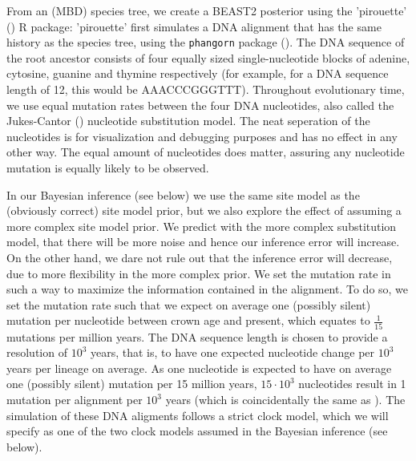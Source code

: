\documentclass{article}
\begin{document}
From an (MBD) species tree, we create a BEAST2 posterior using
the 'pirouette' (\cite{pirouette}) R package: 
'pirouette' first simulates a DNA alignment that has the same history
as the species tree, using the \verb;phangorn; package (\cite{phangorn}).
The DNA sequence of the root ancestor consists of four equally sized single-nucleotide 
blocks of adenine, cytosine, guanine and thymine 
respectively (for example, for a DNA sequence length of 12, this would 
be AAACCCGGGTTT). Throughout evolutionary time, we use equal 
mutation rates between the four DNA nucleotides, 
also called the Jukes-Cantor (\cite{jc69}) nucleotide substitution model.
The neat seperation of the nucleotides is for visualization and debugging
purposes and has no effect in any other way. 
The equal amount of nucleotides does matter, assuring any nucleotide
mutation is equally likely to be observed.

In our Bayesian inference (see below) we use the same site model as the (obviously correct) site model prior,
but we also explore the effect of assuming a more complex site model prior.
We predict with the more complex substitution model, 
that there will be more noise and hence our inference error will increase.
On the other hand, we dare not rule out that the inference error will decrease,
due to more flexibility in the more complex prior.
We set the mutation rate in such a way to maximize the information contained in the alignment.
To do so, we set the mutation rate such that we expect on average one (possibly silent) mutation per nucleotide
between crown age and present, which equates to $\frac{1}{15}$ mutations
per million years.
The DNA sequence length is chosen to provide a
resolution of $10^3$ years, 
that is, to have one expected nucleotide change 
per $10^3$ years per lineage on average. As one nucleotide is expected 
to have on average one (possibly silent) mutation per 15 million years, $15 \cdot 10^3$
nucleotides result in 1 mutation per alignment per $10^3$ years (which is
coincidentally the same as \cite{moller2018}). 
The simulation of these DNA aligments follows a strict clock model, 
which we will specify as one of the two clock models assumed in the Bayesian inference (see below).
\end{document}
